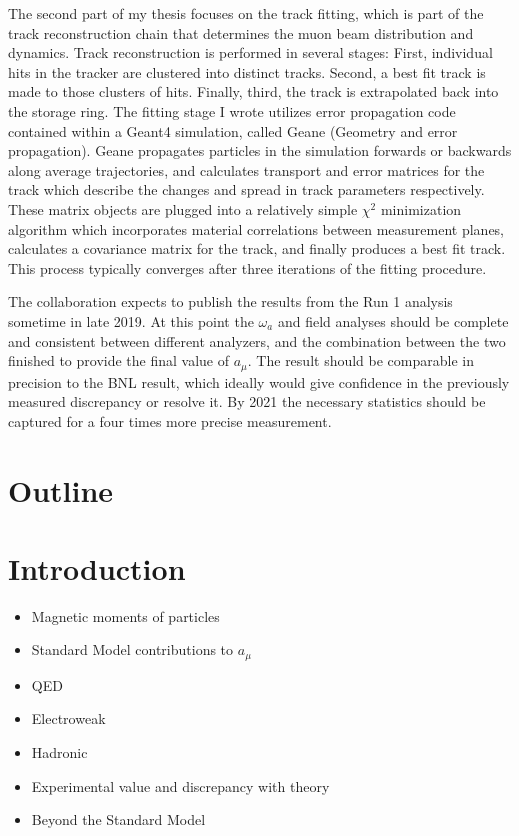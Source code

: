 \documentclass[12pt,letterpaper]{article}
\def\wa{$\omega_{a}$\xspace}
\def\chisq{$\chi^{2}$\xspace}
\def\amu{$a_{\mu}$\xspace}
\begin{document}
The second part of my thesis focuses on the track fitting, which is part of the track reconstruction chain that determines the muon beam distribution and dynamics. Track reconstruction is performed in several stages: First, individual hits in the tracker are clustered into distinct tracks. Second, a best fit track is made to those clusters of hits. Finally, third, the track is extrapolated back into the storage ring. The fitting stage I wrote utilizes error propagation code contained within a Geant4 simulation, called Geane (Geometry and error propagation). Geane propagates particles in the simulation forwards or backwards along average trajectories, and calculates transport and error matrices for the track which describe the changes and spread in track parameters respectively. These matrix objects are plugged into a relatively simple \chisq minimization algorithm which incorporates material correlations between measurement planes, calculates a covariance matrix for the track, and finally produces a best fit track. This process typically converges after three iterations of the fitting procedure.


The collaboration expects to publish the results from the Run 1 analysis sometime in late 2019. At this point the \wa and field analyses should be complete and consistent between different analyzers, and the combination between the two finished to provide the final value of \amu. The result should be comparable in precision to the BNL result, which ideally would give confidence in the previously measured discrepancy or resolve it. By 2021 the necessary statistics should be captured for a four times more precise measurement.



\section*{Outline}

\section{Introduction}

\begin{itemize}
	\item{Magnetic moments of particles}
	\item{Standard Model contributions to $a_{\mu}$}
	\item{QED}
	\item{Electroweak}
	\item{Hadronic}
	\item{Experimental value and discrepancy with theory}
	\item{Beyond the Standard Model}
\end{itemize}
\end{document}
